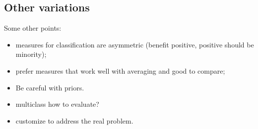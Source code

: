 \subsection{Other variations}

Some other points:
\begin{itemize}
  \item measures for classification are asymmetric (benefit positive, positive should be minority);
  \item prefer measures that work well with averaging and good to compare;
  \item Be careful with priors.
  \item multiclass how to evaluate?
  \item customize to address the real problem.
\end{itemize}
